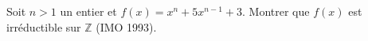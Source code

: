 Soit $n > 1$ un entier et $f(x) = x^n + 5x^{n-1} + 3$. Montrer que $f(x)$ est irréductible sur $\mathbb{Z}$ (IMO 1993).
